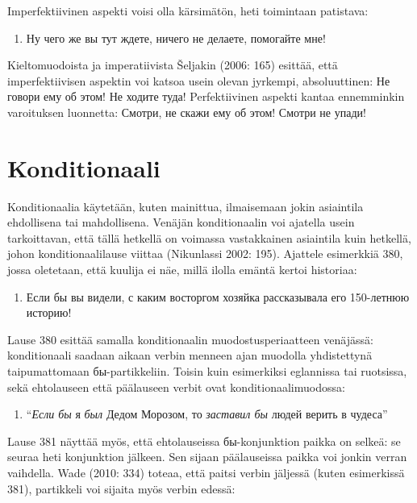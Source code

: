 \documentclass[]{scrreprt}
\providecommand{\tightlist}{%
  \setlength{\itemsep}{0pt}\setlength{\parskip}{0pt}}
\begin{document}
Imperfektiivinen aspekti voisi olla kärsimätön, heti toimintaan
patistava:

\begin{enumerate}
\def\labelenumi{(\arabic{enumi})}
\setcounter{enumi}{378}
\tightlist
\item
  Ну чего же вы тут ждете, ничего не делаете, помогайте мне!
\end{enumerate}

Kieltomuodoista ja imperatiivista Šeljakin (2006: 165) esittää, että
imperfektiivisen aspektin voi katsoa usein olevan jyrkempi,
absoluuttinen: Не говори ему об этом! Не ходите туда! Perfektiivinen
aspekti kantaa ennemminkin varoituksen luonnetta: Смотри, не скажи ему
об этом! Смотри не упади!

\section{Konditionaali}\label{konditionaali}

Konditionaalia käytetään, kuten mainittua, ilmaisemaan jokin asiaintila
ehdollisena tai mahdollisena. Venäjän konditionaalin voi ajatella usein
tarkoittavan, että tällä hetkellä on voimassa vastakkainen asiaintila
kuin hetkellä, johon konditionaalilause viittaa (Nikunlassi 2002: 195).
Ajattele esimerkkiä 380, jossa oletetaan, että kuulija ei näe, millä
ilolla emäntä kertoi historiaa:

\begin{enumerate}
\def\labelenumi{(\arabic{enumi})}
\setcounter{enumi}{379}
\tightlist
\item
  Если бы вы видели, с каким восторгом хозяйка рассказывала его
  150-летнюю историю!
\end{enumerate}

Lause 380 esittää samalla konditionaalin muodostusperiaatteen venäjässä:
konditionaali saadaan aikaan verbin menneen ajan muodolla yhdistettynä
taipumattomaan бы-partikkeliin. Toisin kuin esimerkiksi eglannissa tai
ruotsissa, sekä ehtolauseen että päälauseen verbit ovat
konditionaalimuodossa:

\begin{enumerate}
\def\labelenumi{(\arabic{enumi})}
\setcounter{enumi}{380}
\tightlist
\item
  ``\emph{Если бы} я \emph{был} Дедом Морозом, то \emph{заставил бы}
  людей верить в чудеса''
\end{enumerate}

Lause 381 näyttää myös, että ehtolauseissa бы-konjunktion paikka on
selkeä: se seuraa heti konjunktion jälkeen. Sen sijaan päälauseissa
paikka voi jonkin verran vaihdella. Wade (2010: 334) toteaa, että paitsi
verbin jäljessä (kuten esimerkissä 381), partikkeli voi sijaita myös
verbin edessä:
\end{document}
